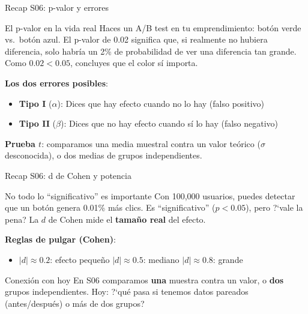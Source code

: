 \documentclass[aspectratio=169, 11pt]{beamer}
\begin{document}
\begin{frame}{Recap S06: p-valor y errores}
\small
\begin{exampleblock}{El p-valor en la vida real}
Haces un A/B test en tu emprendimiento: bot\'on verde vs.\ bot\'on azul. El p-valor de 0.02 significa que, \alert{si realmente no hubiera diferencia}, solo habr\'ia un 2\% de probabilidad de ver una diferencia tan grande. Como $0.02 < 0.05$, concluyes que el color s\'i importa.
\end{exampleblock}

\vspace{0.2cm}
\textbf{Los dos errores posibles}:
\begin{itemize}\setlength{\itemsep}{1pt}
  \item \textbf{Tipo I} ($\alpha$): Dices que hay efecto cuando no lo hay (falso positivo)
  \item \textbf{Tipo II} ($\beta$): Dices que no hay efecto cuando s\'i lo hay (falso negativo)
\end{itemize}

\vspace{0.1cm}
\textbf{Prueba $t$}: comparamos una media muestral contra un valor te\'orico ($\sigma$ desconocida), o dos medias de grupos \alert{independientes}.
\end{frame}

\begin{frame}{Recap S06: d de Cohen y potencia}
\small
\begin{exampleblock}{No todo lo ``significativo'' es importante}
Con 100{,}000 usuarios, puedes detectar que un bot\'on genera 0.01\% m\'as clics. Es ``significativo'' ($p < 0.05$), pero ?`vale la pena? La $d$ de Cohen mide el \textbf{tama\~no real} del efecto.
\end{exampleblock}

\vspace{0.2cm}
\textbf{Reglas de pulgar (Cohen)}:
\begin{itemize}\setlength{\itemsep}{1pt}
  \item $|d| \approx 0.2$: efecto peque\~no \quad $|d| \approx 0.5$: mediano \quad $|d| \approx 0.8$: grande
\end{itemize}

\vspace{0.2cm}
\begin{block}{Conexi\'on con hoy}
En S06 comparamos \textbf{una} muestra contra un valor, o \textbf{dos} grupos independientes. Hoy: ?`qu\'e pasa si tenemos datos pareados (antes/despu\'es) o \alert{m\'as de dos} grupos?
\end{block}
\end{frame}
\end{document}
